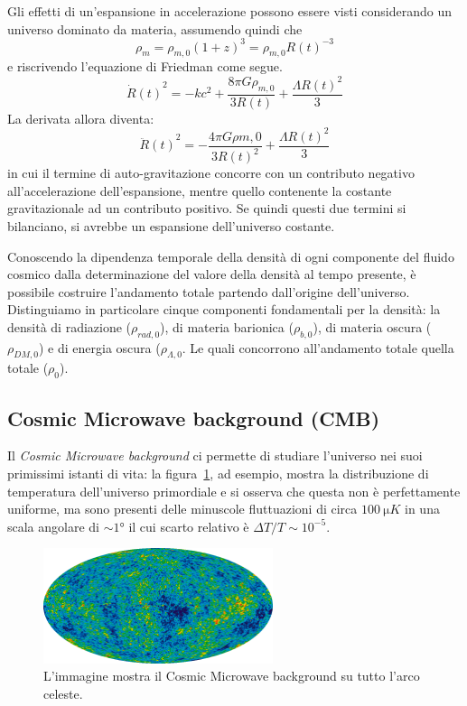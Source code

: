 Gli effetti di un'espansione in accelerazione possono essere visti considerando un universo dominato da materia, assumendo quindi che
\[
    \rho_{m} = \rho_{m, 0}{(1+z)}^3 = \rho_{m,0}{R(t)}^{-3}
\]
e riscrivendo l'equazione di Friedman come segue.
\[
    {\dot{R}(t)}^2 = - kc^2 + \frac{8\pi G \rho_{m,0}}{3R(t)} + \frac{\Lambda {R(t)}^2}{3}
\]
La derivata allora diventa:
\[
    {\ddot{R}(t)}^2 = -\frac{4\pi G \rho{m,0}}{3{R(t)}^2}+ \frac{\Lambda {R(t)}^2}{3}
\]
in cui il termine di auto-gravitazione concorre con un contributo negativo all'accelerazione dell'espansione, mentre quello contenente la costante gravitazionale ad un contributo positivo. Se quindi questi due termini si bilanciano, si avrebbe un espansione dell'universo costante.

Conoscendo la dipendenza temporale della densità di ogni componente del fluido cosmico dalla determinazione del valore della densità al tempo presente, è possibile costruire l'andamento totale partendo dall'origine dell'universo. Distinguiamo in particolare cinque componenti fondamentali per la densità: la densità di radiazione ($\rho_{rad, 0}$), di materia barionica ($\rho_{b, 0}$), di materia oscura ($\rho_{DM, 0}$) e di energia oscura ($\rho_{\Lambda, 0}$. Le quali concorrono all'andamento totale quella totale ($\rho_{0}$).

\subsection{Cosmic Microwave background (CMB)}\label{sec:CMB}
Il \textit{Cosmic Microwave background} ci permette di studiare l'universo nei suoi primissimi istanti di vita: la figura~\ref{fig:CMB1}, ad esempio, mostra la distribuzione di temperatura dell'universo primordiale e si osserva che questa non è perfettamente uniforme, ma sono presenti delle minuscole fluttuazioni di circa $\SI{100}{\micro K}$ in una scala angolare di $\sim 1\si{\degree}$ il cui scarto relativo è $\Delta T/T \sim 10^{-5}$.
\begin{figure}
    \centering
    \includegraphics[width = 0.6\textwidth]{immagini/CMB1.png}
    \caption{L'immagine mostra il Cosmic Microwave background su tutto l'arco celeste.}\label{fig:CMB1}
\end{figure}

